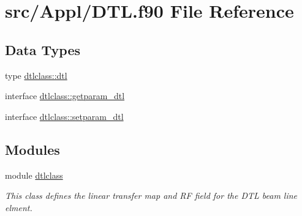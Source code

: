 \hypertarget{_d_t_l_8f90}{}\section{src/\+Appl/\+D\+TL.f90 File Reference}
\label{_d_t_l_8f90}
\subsection*{Data Types}
\begin{DoxyCompactItemize}
\item 
type \mbox{\hyperlink{namespacedtlclass_structdtlclass_1_1dtl}{dtlclass\+::dtl}}
\item 
interface \mbox{\hyperlink{interfacedtlclass_1_1getparam__dtl}{dtlclass\+::getparam\+\_\+dtl}}
\item 
interface \mbox{\hyperlink{interfacedtlclass_1_1setparam__dtl}{dtlclass\+::setparam\+\_\+dtl}}
\end{DoxyCompactItemize}
\subsection*{Modules}
\begin{DoxyCompactItemize}
\item 
module \mbox{\hyperlink{namespacedtlclass}{dtlclass}}
\begin{DoxyCompactList}\small\item\em This class defines the linear transfer map and RF field for the D\+TL beam line elment. \end{DoxyCompactList}\end{DoxyCompactItemize}
